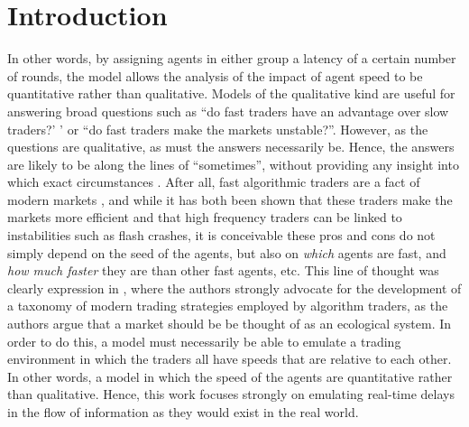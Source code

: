 \part{Introduction}
\begin{comment}
Many models of artificial markets resemble typical game theoretic models in that all trading is round based. Typically all agents receive the market information and evaluate their strategies once every round. Such models are very useful when all agents are more or less equally fast, since it is then reasonable to assume that they have access to the same information. 

The model proposed in this work is different from such models in that it assumes that agents generally do \textit{not} have access to the same information when they evaluate their strategies. 
\end{comment}

In other words, by assigning agents in either group a latency of a certain number of rounds, the model allows the analysis of the impact of agent speed to be quantitative rather than qualitative. Models of the qualitative kind are useful for answering broad questions such as ``do fast traders have an advantage over slow traders?' ' or ``do fast traders make the markets unstable?''. However, as the questions are qualitative, as must the answers necessarily be. Hence, the answers are likely to be along the lines of ``sometimes'', without providing any insight into which exact circumstances . After all, fast algorithmic traders are a fact of modern markets , and while it has both been shown that these traders make the markets more efficient and that high frequency traders can be linked to instabilities such as flash crashes, it is conceivable these pros and cons do not simply depend on the seed of the agents, but also on \textit{which} agents are fast, and \textit{how much faster} they are than other fast agents, etc. This line of thought was clearly expression in \cite{farmer2013ecological}, where the authors strongly advocate for the development of a taxonomy of modern trading strategies employed by algorithm traders, as the authors argue that a market should be be thought of as an ecological system. In order to do this, a model must necessarily be able to emulate a trading environment in which the traders all have speeds that are relative to each other. In other words, a model in which the speed of the agents are quantitative rather than qualitative. Hence, this work focuses strongly on emulating real-time delays in the flow of information as they would exist in the real world.


